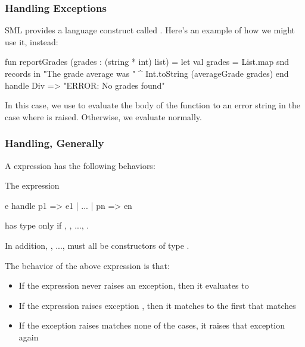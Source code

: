 \documentclass[aspectratio=169]{beamer}
\begin{document}
\begin{frame}[fragile]
  \frametitle{Handling Exceptions}

  SML provides a language construct called . Here's an example
  of how we might use it, instead:

  \begin{codeblock}
    fun reportGrades (grades : (string * int) list) =
      let
        val grades = List.map snd records
      in
        "The grade average was " ^ Int.toString (averageGrade grades) 
      end
      handle Div => "ERROR: No grades found" 
  \end{codeblock}

  \vspace{\fill}

  In this case, we use  to evaluate the body of the function to
  an error string in the case where  is raised. Otherwise, we 
  evaluate normally. 
\end{frame}

\begin{frame}[fragile]
  \frametitle{Handling, Generally}

  A  expression has the following behaviors: 

  \vspace{\fill}

  The expression 
  \begin{codeblock}
    e handle p1 => e1 | ... | pn => en
  \end{codeblock}

  has type  only if , , ..., .

  \vspace{5pt}

  In addition, , ...,  must all be constructors of type
  .

  \vspace{\fill}

  The behavior of the above  expression is that: 
  \begin{itemize}
    \item If the expression  never raises an exception, then it 
    evaluates to 
    \item If the expression  raises exception , then
    it matches to the first  that matches 
    \item If the exception  raises matches none of the
     cases, it raises that exception again 
  \end{itemize}
\end{frame}
\end{document}
